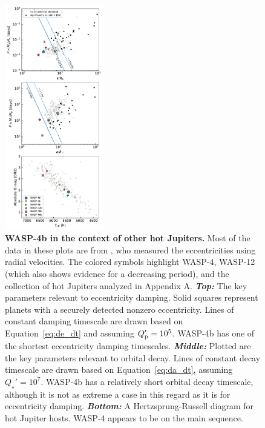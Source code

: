 \documentclass[12pt,twocolumn,tighten]{aastex62}
\begin{document}
\begin{figure}[t]
  \begin{center}
    \includegraphics[width=0.385\textwidth]{f5.pdf}
  \end{center}
  \vspace{-0.5cm}
  \caption{
    {\bf WASP-4b in the context of other hot Jupiters.}
    Most of the data in these plots are from \citet{bonomo_gaps_2017},
    who measured the eccentricities using radial velocities.  The
    colored symbols highlight WASP-4, WASP-12 (which also shows
    evidence for a decreasing period), and the collection of hot
    Jupiters analyzed in Appendix A.
    {\bf \it Top:}
    The key parameters relevant to eccentricity damping.  Solid
    squares represent planets with a securely detected nonzero
    eccentricity. Lines of constant damping timescale are drawn based
    on Equation~\ref{eq:de_dt} and assuming $Q_{\rm p}' = 10^5$.
    WASP-4b has one of the shortest eccentricity damping timescales.
    {\bf \it Middle:} 
    Plotted are the key parameters relevant to orbital decay.  Lines
    of constant decay timescale are drawn based on
    Equation~\ref{eq:da_dt}, assuming $Q_\star' = 10^7$.  WASP-4b has
    a relatively short orbital decay timescale, although it is not as
    extreme a case in this regard as it is for eccentricity damping.
    {\bf \it Bottom:}
    A Hertzsprung-Russell diagram for hot Jupiter hosts. WASP-4
    appears to be on the main sequence.
    \label{fig:context}
  }
\end{figure}
\end{document}
